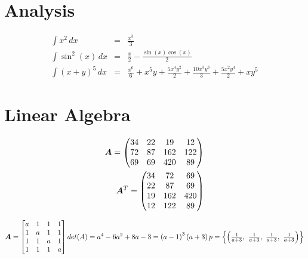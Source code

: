 \documentclass[12pt]{article}
\begin{document}
    \section{Analysis}\label{sec:analysis}

    \begin{align}
        \int x^{2}\, dx &=& \frac{x^{3}}{3} \\
        \int \sin^{2}{\left(x \right)}\, dx &=& \frac{x}{2} - \frac{\sin{\left(x \right)} \cos{\left(x \right)}}{2} \\
        \int \left(x + y\right)^{5}\, dx &=& \frac{x^{6}}{6} + x^{5} y + \frac{5 x^{4} y^{2}}{2} + \frac{10 x^{3} y^{3}}{3} + \frac{5 x^{2} y^{4}}{2} + x y^{5}
    \end{align}


    \section{Linear Algebra}\label{sec:linalg}

    \begin{align}
        {\bm{A}} = \left(\begin{matrix}
                        34 & 22 & 19 & 12\\72 & 87 & 162 & 122\\69 & 69 & 420 & 89
        \end{matrix}\right) \\
        {\bm{A}}^{T} = \left(\begin{matrix}
                            34 & 72 & 69\\22 & 87 & 69\\19 & 162 & 420\\12 & 122 & 89
        \end{matrix}\right)
    \end{align}

    \begin{math}
        {\bm{A}}=\left[\begin{matrix}a & 1 & 1 & 1\\1 & a & 1 & 1\\1 & 1 & a & 1\\1 & 1 & 1 & a\end{matrix}\right] \\
        det(A)=a^{4} - 6 a^{2} + 8 a - 3=\left(a - 1\right)^{3} \left(a + 3\right) \\
        p=\left\{\left( \frac{1}{a + 3}, \  \frac{1}{a + 3}, \  \frac{1}{a + 3}, \  \frac{1}{a + 3}\right)\right\}
    \end{math}
\end{document}
